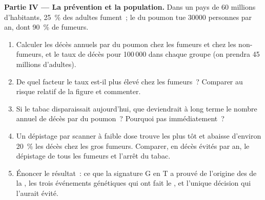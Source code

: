 \begin{problem}
\medskip
\noindent\textbf{Partie IV --- La prévention et la population.}
Dans un pays de 60 millions d'habitants, 25~\% des adultes fument~; le
 du poumon tue $\num{30000}$ personnes par an, dont 90~\% de
fumeurs.
\begin{enumerate}[resume]
  \item Calculer les décès annuels par  du poumon chez les
        fumeurs et chez les non-fumeurs, et le taux de décès pour
        100\,000 dans chaque groupe (on prendra 45 millions
        d'adultes).
  \item De quel facteur le taux est-il plus élevé chez les fumeurs~?
        Comparer au risque relatif de la figure et commenter.
  \item Si le tabac disparaissait aujourd'hui, que deviendrait à long
        terme le nombre annuel de décès par  du poumon~? Pourquoi
        pas immédiatement~?
  \item Un dépistage par scanner à faible dose trouve les  plus
        tôt et abaisse d'environ 20~\% les décès chez les gros fumeurs.
        Comparer, en décès évités par an, le dépistage de tous les
        fumeurs et l'arrêt du tabac.
  \item Énoncer le résultat~: ce que la signature G en T a prouvé de
        l'origine des  de la , les trois événements
        génétiques qui ont fait le , et l'unique décision qui
        l'aurait évité.
\end{enumerate}
\end{problem}
